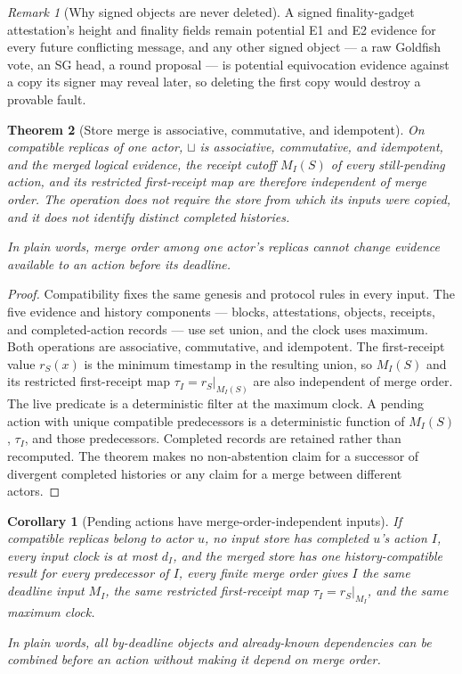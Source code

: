 \ifx\litemode\undefined\documentclass{article}\fi
\theoremstyle{plain}
\newtheorem{theorem}{Theorem}
\newtheorem{corollary}{Corollary}
\theoremstyle{definition}
\theoremstyle{remark}
\newtheorem{remark}[theorem]{Remark}
\begin{document}
\begin{remark}[Why signed objects are never deleted]
\label{rem:no-deletion}
A signed finality-gadget attestation's height and finality fields remain
potential E1 and E2 evidence for every future conflicting message, and
any other signed object --- a raw Goldfish vote, an SG head, a round
proposal --- is potential equivocation evidence against a copy its
signer may reveal later, so deleting the first copy would destroy a
provable fault.
\end{remark}

\begin{theorem}[Store merge is associative, commutative, and idempotent]
\label{thm:store-merge}
On compatible replicas of one actor, \(\sqcup\) is associative, commutative,
and idempotent, and the merged logical evidence, the receipt cutoff
\(M_I(S)\) of every still-pending action, and its restricted
first-receipt map are therefore independent of merge order.  The operation does not require the store
from which its inputs were copied, and it does not identify distinct
completed histories.

In plain words, merge order among one actor's replicas cannot change evidence
available to an action before its deadline.
\end{theorem}

\begin{proof}
Compatibility fixes the same genesis and protocol rules in every
input.  The five evidence and history components --- blocks,
attestations, objects, receipts, and completed-action records --- use
set union, and the clock uses maximum.  Both operations are associative, commutative, and idempotent.
The first-receipt value \(r_S(x)\) is the minimum timestamp in the resulting
union, so \(M_I(S)\) and its restricted first-receipt map
\(\tau_I=r_S|_{M_I(S)}\) are also independent of merge order.  The
live predicate
is a deterministic filter at the maximum clock.  A pending action with unique
compatible predecessors is a deterministic function of \(M_I(S)\),
\(\tau_I\), and those predecessors.  Completed records are retained rather than recomputed.
The theorem makes no non-abstention claim for a successor of divergent
completed histories or any claim for a merge between different actors.
\end{proof}

\begin{corollary}[Pending actions have merge-order-independent inputs]
\label{cor:merged-action-inputs}
If compatible replicas belong to actor \(u\), no input store has completed
\(u\)'s action \(I\), every input clock is at most \(d_I\), and the merged
store has one history-compatible result for every predecessor of \(I\), every
finite merge order gives \(I\) the same deadline input \(M_I\), the
same restricted first-receipt map \(\tau_I=r_S|_{M_I}\), and the same
maximum clock.

In plain words, all by-deadline objects and already-known dependencies can be
combined before an action without making it depend on merge order.
\end{corollary}
\end{document}
